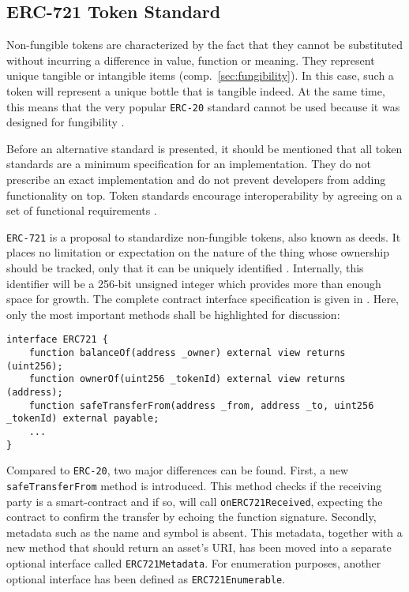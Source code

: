 \subsection{ERC-721 Token Standard}
Non-fungible tokens are characterized by the fact that they cannot be substituted without incurring a difference in value, function or meaning. They represent unique tangible or intangible items (comp.~\ref{sec:fungibility}). In this case, such a token will represent a unique bottle that is tangible indeed. At the same time, this means that the very popular \texttt{\acs{ERC}-20} standard cannot be used because it was designed for fungibility \cite{erc20}. 

Before an alternative standard is presented, it should be mentioned that all token standards are a minimum specification for an implementation. They do not prescribe an exact implementation and do not prevent developers from adding functionality on top. Token standards encourage interoperability by agreeing on a set of functional requirements \cite[pp.~198--199]{Antonopoulos.2018}. 

\texttt{\acs{ERC}-721} is a proposal to standardize non-fungible tokens, also known as deeds. It places no limitation or expectation on the nature of the thing whose ownership should be tracked, only that it can be uniquely identified \cite[p.~197]{Antonopoulos.2018}. Internally, this identifier will be a 256-bit unsigned integer which provides more than enough space for growth. The complete contract interface specification is given in \cite{erc721}. Here, only the most important methods shall be highlighted for discussion:

\begin{lstlisting}[language=Solidity, caption=ERC-721 contract interface specification, label=lst:erc721]
interface ERC721 {
    function balanceOf(address _owner) external view returns (uint256);
    function ownerOf(uint256 _tokenId) external view returns (address);
    function safeTransferFrom(address _from, address _to, uint256 _tokenId) external payable;
    ...
}
\end{lstlisting}
 
Compared to \texttt{\acs{ERC}-20}, two major differences can be found. First, a new \texttt{safeTransferFrom} method is introduced. This method checks if the receiving party is a smart-contract and if so, will call \texttt{onERC721Received}, expecting the contract to confirm the transfer by echoing the function signature. Secondly, metadata such as the name and symbol is absent. This metadata, together with a new method that should return an asset's URI, has been moved into a separate optional interface called \texttt{ERC721Metadata}. For enumeration purposes, another optional interface has been defined as  \texttt{ERC721Enumerable}.

